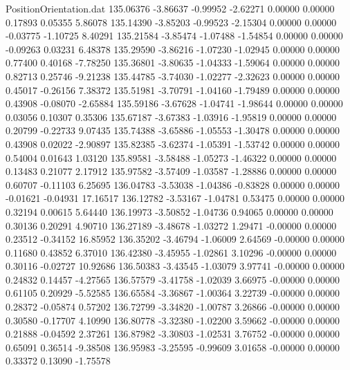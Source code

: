 \begin{filecontents}{PositionOrientation.dat}
 135.06376   -3.86637   -0.99952    -2.62271    0.00000    0.00000    0.17893    0.05355    5.86078
 135.14390   -3.85203   -0.99523    -2.15304    0.00000    0.00000   -0.03775   -1.10725    8.40291
 135.21584   -3.85474   -1.07488    -1.54854    0.00000    0.00000   -0.09263    0.03231    6.48378
 135.29590   -3.86216   -1.07230    -1.02945    0.00000    0.00000    0.77400    0.40168   -7.78250
 135.36801   -3.80635   -1.04333    -1.59064    0.00000    0.00000    0.82713    0.25746   -9.21238
 135.44785   -3.74030   -1.02277    -2.32623    0.00000    0.00000    0.45017   -0.26156    7.38372
 135.51981   -3.70791   -1.04160    -1.79489    0.00000    0.00000    0.43908   -0.08070   -2.65884
 135.59186   -3.67628   -1.04741    -1.98644    0.00000    0.00000    0.03056    0.10307    0.35306
 135.67187   -3.67383   -1.03916    -1.95819    0.00000    0.00000    0.20799   -0.22733    9.07435
 135.74388   -3.65886   -1.05553    -1.30478    0.00000    0.00000    0.43908    0.02022   -2.90897
 135.82385   -3.62374   -1.05391    -1.53742    0.00000    0.00000    0.54004    0.01643    1.03120
 135.89581   -3.58488   -1.05273    -1.46322    0.00000    0.00000    0.13483    0.21077    2.17912
 135.97582   -3.57409   -1.03587    -1.28886    0.00000    0.00000    0.60707   -0.11103    6.25695
 136.04783   -3.53038   -1.04386    -0.83828    0.00000    0.00000   -0.01621   -0.04931   17.16517
 136.12782   -3.53167   -1.04781     0.53475    0.00000    0.00000    0.32194    0.00615    5.64440
 136.19973   -3.50852   -1.04736     0.94065    0.00000    0.00000    0.30136    0.20291    4.90710
 136.27189   -3.48678   -1.03272     1.29471   -0.00000    0.00000    0.23512   -0.34152   16.85952
 136.35202   -3.46794   -1.06009     2.64569   -0.00000    0.00000    0.11680    0.43852    6.37010
 136.42380   -3.45955   -1.02861     3.10296   -0.00000    0.00000    0.30116   -0.02727   10.92686
 136.50383   -3.43545   -1.03079     3.97741   -0.00000    0.00000    0.24832    0.14457   -4.27565
 136.57579   -3.41758   -1.02039     3.66975   -0.00000    0.00000    0.61105    0.20929   -5.52585
 136.65584   -3.36867   -1.00364     3.22739   -0.00000    0.00000    0.28372   -0.05874    0.57202
 136.72799   -3.34820   -1.00787     3.26866   -0.00000    0.00000    0.30580   -0.17707    4.10990
 136.80778   -3.32380   -1.02200     3.59662   -0.00000    0.00000    0.21888   -0.04592    2.37261
 136.87982   -3.30803   -1.02531     3.76752   -0.00000    0.00000    0.65091    0.36514   -9.38508
 136.95983   -3.25595   -0.99609     3.01658   -0.00000    0.00000    0.33372    0.13090   -1.75578

\end{filecontents}
